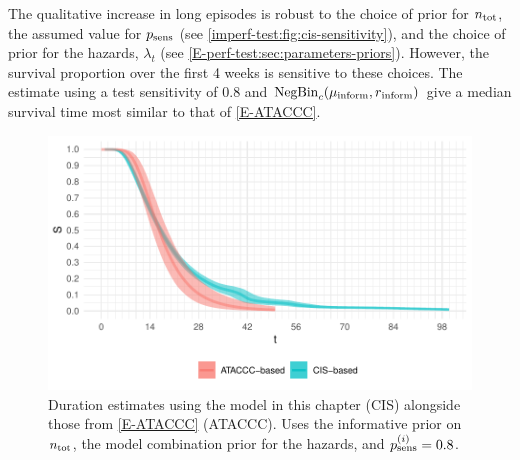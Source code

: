 \documentclass[thesis.tex]{subfiles}
\begin{document}
The qualitative increase in long episodes is robust to the choice of prior for $n_\text{tot}$, the assumed value for $p_\text{sens}$ (see \cref{imperf-test:fig:cis-sensitivity}), and the choice of prior for the hazards, $\lambda_t$ (see \cref{E-perf-test:sec:parameters-priors}).
However, the survival proportion over the first 4 weeks is sensitive to these choices.
The estimate using a test sensitivity of 0.8 and $\operatorname{NegBin}_{c}(\mu{_{\text{inform}}}, r{_{\text{inform}}})$ give a median survival time most similar to that of \cref{E-ATACCC}.
\begin{figure}
  \centering \includegraphics{cis-imperfect-testing/CIS_final}
  \caption[Comparing estimates of the duration distribution.]{
    Duration estimates using the model in this chapter (CIS) alongside those from \cref{E-ATACCC} (ATACCC).
    Uses the informative prior on $n_\text{tot}$, the model combination prior for the hazards, and $p_\text{sens}^{(i)} = 0.8$.
  }
  \label{imperf-test:fig:cis-estimates}
\end{figure}
\end{document}
